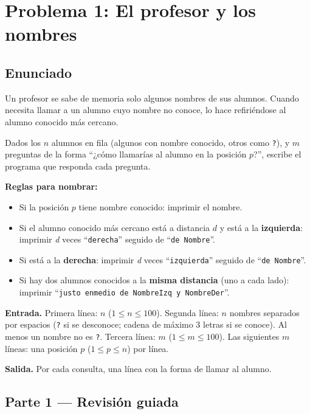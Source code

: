 \documentclass[12pt, oneside]{article}
\begin{document}
\newpage

\section{Problema 1: El profesor y los nombres}

\subsection{Enunciado}

Un profesor se sabe de memoria solo algunos nombres de sus alumnos.
Cuando necesita llamar a un alumno cuyo nombre no conoce, lo hace
refiriéndose al alumno conocido más cercano.

Dados los $n$ alumnos en fila (algunos con nombre conocido, otros como
\texttt{?}), y $m$ preguntas de la forma ``¿cómo llamarías al alumno en
la posición $p$?'', escribe el programa que responda cada pregunta.

\textbf{Reglas para nombrar:}
\begin{itemize}
  \item Si la posición $p$ tiene nombre conocido: imprimir el nombre.
  \item Si el alumno conocido más cercano está a distancia $d$ y está
        a la \textbf{izquierda}: imprimir \textit{d} veces
        ``\texttt{derecha}'' seguido de ``\texttt{de Nombre}''.
  \item Si está a la \textbf{derecha}: imprimir \textit{d} veces
        ``\texttt{izquierda}'' seguido de ``\texttt{de Nombre}''.
  \item Si hay dos alumnos conocidos a la \textbf{misma distancia}
        (uno a cada lado): imprimir
        ``\texttt{justo enmedio de NombreIzq y NombreDer}''.
\end{itemize}

\textbf{Entrada.}
Primera línea: $n$ ($1 \le n \le 100$).
Segunda línea: $n$ nombres separados por espacios (\texttt{?} si se
desconoce; cadena de máximo 3 letras si se conoce).
Al menos un nombre no es \texttt{?}.
Tercera línea: $m$ ($1 \le m \le 100$).
Las siguientes $m$ líneas: una posición $p$ ($1 \le p \le n$) por línea.

\textbf{Salida.}
Por cada consulta, una línea con la forma de llamar al alumno.

\subsection{Parte 1 — Revisión guiada}
\end{document}

